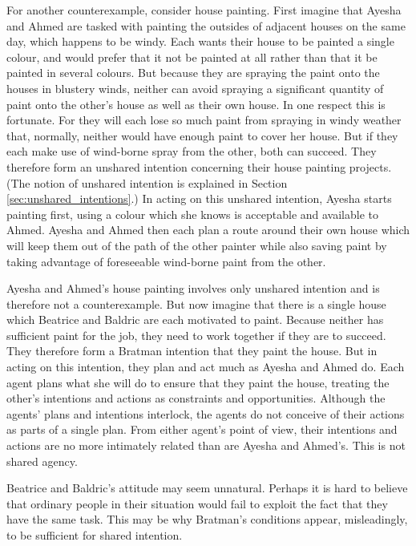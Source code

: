 \documentclass[12pt,\papersize]{extarticle}
\begin{document}
For another counterexample, consider house painting.  
First imagine that Ayesha and Ahmed are tasked with painting the outsides of adjacent houses on the same day,
which happens to be windy.
Each wants their house to be painted a single colour, and would prefer that it not be painted at all rather than that it be painted in several colours.
But because they are spraying the paint onto the houses in blustery winds, neither can avoid spraying a significant quantity of paint onto the other's house as well as their own house. 
In one respect this is fortunate. 
For they will each lose so much paint from spraying in windy weather that, normally, neither would have enough paint to cover her house.
But if they each make use of wind-borne spray from the other, both can succeed.
They therefore form an unshared intention concerning their house painting projects. 
(The notion of  unshared intention is explained in Section \vref{sec:unshared_intentions}.)
In acting on this unshared intention,
Ayesha starts painting first, using a colour which she knows is acceptable and available to Ahmed.
Ayesha and Ahmed then each plan a route around their own house which will keep them out of the path of the other painter while also saving paint by taking advantage of foreseeable  wind-borne paint from the other.

Ayesha and Ahmed's house painting involves only unshared intention and is therefore not a counterexample.
But now imagine that there is a single house which Beatrice and Baldric are each motivated to paint.
Because neither has sufficient paint for the job, they need to work together if they are to succeed.
They therefore form a Bratman intention that they paint the house.
But in acting on this intention, they plan and act much as Ayesha and Ahmed do.
Each agent plans what she will do to ensure that they paint the house, treating the other's intentions and actions as constraints and opportunities. 
Although the agents' plans and intentions interlock, 
the agents do not conceive of their actions as parts of a single plan.
From either agent's point of view, their intentions and actions are no more intimately related than are Ayesha and Ahmed's.
This is not shared agency.


Beatrice and Baldric's attitude may seem unnatural. 
Perhaps it is hard to believe that ordinary people in their situation would  fail to exploit the fact that they have the same task.
This may be why Bratman's conditions appear, misleadingly, to be sufficient for shared intention.
\end{document}
